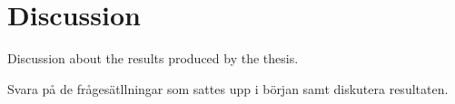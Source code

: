 \chapter{Discussion}
Discussion about the results produced by the thesis.

Svara på de frågesätllningar som sattes upp i början samt diskutera resultaten.